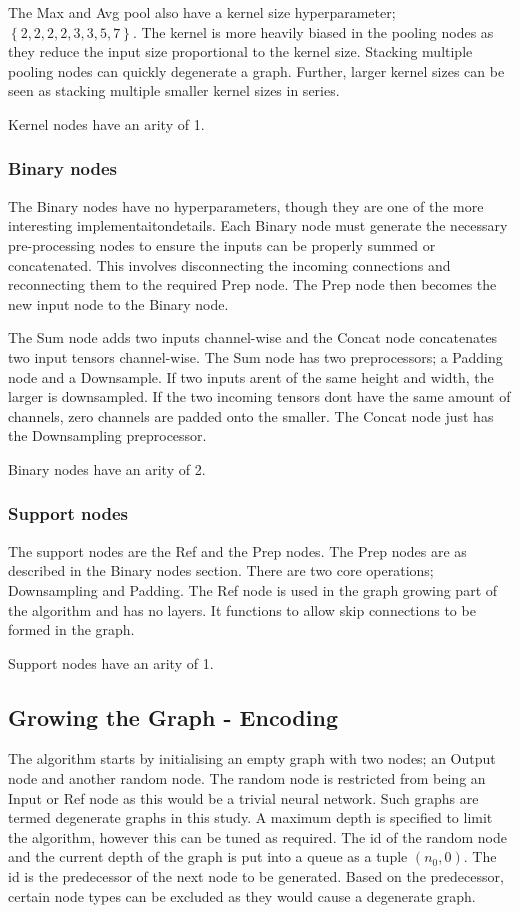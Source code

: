 The Max and Avg pool also have a kernel size hyperparameter;$ \left\{2, 2, 2, 2, 3, 3, 5, 7 \right\}$. The kernel is more heavily biased in the pooling nodes as they reduce the input size proportional to the kernel size. Stacking multiple pooling nodes can quickly degenerate a graph. Further, larger kernel sizes can be seen as stacking multiple smaller kernel sizes in series.

Kernel nodes have an arity of 1.


\subsubsection{Binary nodes}

The Binary nodes have no hyperparameters, though they are one of the more interesting implementaitondetails. Each Binary node must generate the necessary pre-processing nodes to ensure the inputs can be properly summed or concatenated. This involves disconnecting the incoming connections and reconnecting them to the required Prep node. The Prep node then becomes the new input node to the Binary node.

The Sum node adds two inputs channel-wise and the Concat node concatenates two input tensors channel-wise. The Sum node has two preprocessors; a Padding node and a Downsample. If two inputs arent of the same height and width, the larger is downsampled. If the two incoming tensors dont have the same amount of channels, zero channels are padded onto the smaller. The Concat node just has the Downsampling preprocessor.

Binary nodes have an arity of 2.
\subsubsection{Support nodes}

The support nodes are the Ref and the Prep nodes. The Prep nodes are as described in the Binary nodes section. There are two core operations; Downsampling and Padding. The Ref node is used in the graph growing part of the algorithm and has no layers. It functions to allow skip connections to be formed in the graph.

Support nodes have an arity of 1.

    \subsection{Growing the Graph - Encoding}

The algorithm starts by initialising an empty graph with two nodes; an Output node and another random node. The random node is restricted from being an Input or Ref node as this would be a trivial neural network. Such graphs are termed degenerate graphs in this study. A maximum depth is specified to limit the algorithm, however this can be tuned as required. The id of the random node and the current depth of the graph is put into a queue as a tuple $(n_{0}, 0)$. The id is the predecessor of the next node to be generated. Based on the predecessor, certain node types can be excluded as they would cause a degenerate graph.

